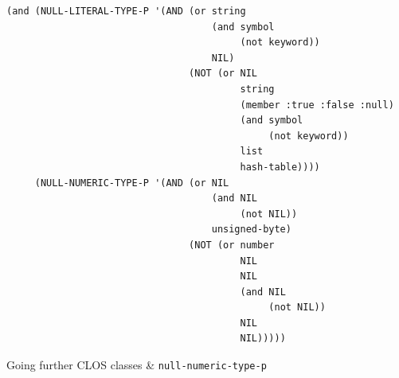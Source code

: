 \documentclass[aspectratio=169]{beamer}
\renewcommand\code[1]{\texttt{#1}}
\begin{document}
\begin{frame}[fragile]
  \begin{popup}{.7}
    \vspace*{-2em}
    \begin{mintedcodebox}
\begin{verbatim}
(and (NULL-LITERAL-TYPE-P '(AND (or string
                                    (and symbol
                                         (not keyword))
                                    NIL)
                                (NOT (or NIL
                                         string
                                         (member :true :false :null)
                                         (and symbol
                                              (not keyword))
                                         list
                                         hash-table))))
     (NULL-NUMERIC-TYPE-P '(AND (or NIL
                                    (and NIL
                                         (not NIL))
                                    unsigned-byte)
                                (NOT (or number
                                         NIL
                                         NIL
                                         (and NIL
                                              (not NIL))
                                         NIL
                                         NIL)))))
\end{verbatim}
    \end{mintedcodebox}
  \end{popup}
\end{frame}

\begin{sectionframe}{Going further}
  CLOS classes \& \code{null-numeric-type-p}
\end{sectionframe}
\end{document}
